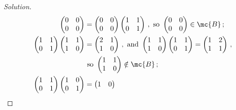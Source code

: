 \begin{proof}[Solution]
\begin{align*}
		\begin{pmatrix}
			0 & 0 \\
			0 & 0
		\end{pmatrix}
		&=
		\begin{pmatrix}
			0 & 0 \\
			0 & 0
		\end{pmatrix}
		\begin{pmatrix}
			1 & 1 \\
			0 & 1
		\end{pmatrix}\,,
		\text{ so }
		\begin{pmatrix}
			0 & 0 \\
			0 & 0
		\end{pmatrix}
		\in \mc{B}\,;
		\\
		\begin{pmatrix}
			1 & 1 \\
			0 & 1
		\end{pmatrix}
		\begin{pmatrix}
			1 & 1 \\
			1 & 0
		\end{pmatrix}
		&=
		\begin{pmatrix}
			2 & 1 \\
			1 & 0
		\end{pmatrix}\,,
		\text{ and }
		\begin{pmatrix}
			1 & 1 \\
			1 & 0
		\end{pmatrix}
		\begin{pmatrix}
			1 & 1 \\
			0 & 1
		\end{pmatrix}
		=
		\begin{pmatrix}
			1 & 2 \\
			1 & 1
		\end{pmatrix}\,,
		\\
		&\text{ so }
		\begin{pmatrix}
			1 & 1 \\
			1 & 0
		\end{pmatrix}
		\notin \mc{B}\,;
		\\
		\begin{pmatrix}
			1 & 1 \\
			0 & 1
		\end{pmatrix}
		\begin{pmatrix}
			1 & 0 \\
			0 & 1
		\end{pmatrix}
		&=
		\begin{pmatrix}
			1 & 0 \\

\end{pmatrix}
\end{align*}
\end{proof}
